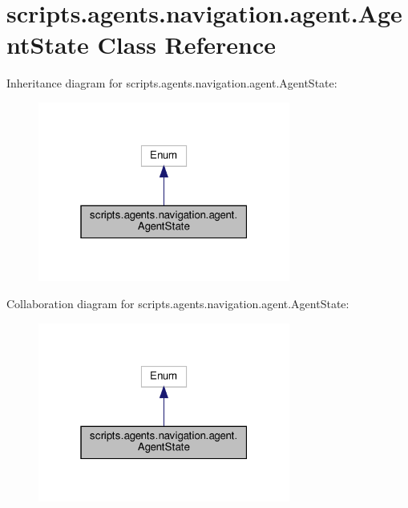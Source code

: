\hypertarget{classscripts_1_1agents_1_1navigation_1_1agent_1_1AgentState}{}\section{scripts.\+agents.\+navigation.\+agent.\+Agent\+State Class Reference}
\label{classscripts_1_1agents_1_1navigation_1_1agent_1_1AgentState}


Inheritance diagram for scripts.\+agents.\+navigation.\+agent.\+Agent\+State\+:
\nopagebreak
\begin{figure}[H]
\begin{center}
\leavevmode
\includegraphics[width=235pt]{d4/dd3/classscripts_1_1agents_1_1navigation_1_1agent_1_1AgentState__inherit__graph}
\end{center}
\end{figure}


Collaboration diagram for scripts.\+agents.\+navigation.\+agent.\+Agent\+State\+:
\nopagebreak
\begin{figure}[H]
\begin{center}
\leavevmode
\includegraphics[width=235pt]{da/d74/classscripts_1_1agents_1_1navigation_1_1agent_1_1AgentState__coll__graph}
\end{center}
\end{figure}
